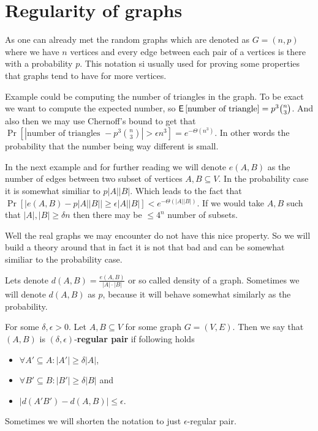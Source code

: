 \chapter{Regularity of graphs}

As one can already met the random graphs which are denoted as $G = (n,p)$ where we have $n$ vertices and every edge between each pair of a vertices is there with a probability $p$. This notation si usually used for proving some properties that graphs tend to have for more vertices.

Example could be computing the number of triangles in the graph. To be exact we want to compute the expected number, so $\operatorname{\textsf{E}\,} [\text{number of triangle}] = p^3 \binom{n}{3}$. And also then we may use Chernoff's bound to get that $\Pr [|\text{number of triangles } - p^3 \binom{n}{3}| > \epsilon n^3] = e^{-\Theta(n^3)}$. In other words the probability that the number being way different is small.

In the next example and for further reading we will denote $e(A,B)$ as the number of edges between two subset of vertices $A, B \subseteq V$. In the probability case it is somewhat similiar to $p |A| |B|$. Which leads to the fact that $\Pr [|e(A,B) - p|A||B|| \geq \epsilon |A||B|] < e^{-\Theta(|A||B|)}$. If we would take $A, B$ such that $|A|, |B| \geq \delta n$ then there may be $\leq 4^n$ number of subsets.

Well the real graphs we may encounter do not have this nice property. So we will build a theory around that in fact it is not that bad and can be somewhat similiar to the probability case.

\begin{defn}
	Lets denote $d(A,B) = \frac{e(A,B)}{|A| \cdot |B|}$ or so called density of a graph. Sometimes we will denote $d(A,B)$ as $p$, because it will behave somewhat similarly as the probability.
\end{defn}

\begin{defn}
	For some $\delta, \epsilon > 0$. Let $A, B \subseteq V$ for some graph $G = (V,E)$. Then we say that $(A,B)$ is $(\delta, \epsilon)$-\textbf{regular pair} if following holds
	
	\begin{itemize}
		\item $\forall A' \subseteq A : |A'| \geq \delta |A|$,
		\item $\forall B' \subseteq B : |B'| \geq \delta |B|$ and
		\item $|d(A'B') - d(A,B)| \leq \epsilon$.
	\end{itemize}
	
	Sometimes we will shorten the notation to just $\epsilon$-regular pair.
\end{defn}

